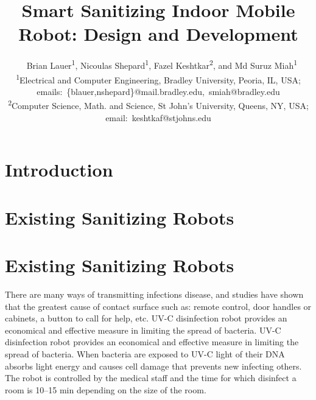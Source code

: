 \documentclass[letterpaper]{article} %
\title{Smart Sanitizing Indoor Mobile Robot: Design and Development}
\author{~%
Brian Lauer\textsuperscript{\rm 1}, Nicoulas Shepard\textsuperscript{\rm 1},
Fazel Keshtkar\textsuperscript{\rm 2}, and Md Suruz Miah\textsuperscript{\rm 1}
\\  
\textsuperscript{\rm 1}Electrical and Computer Engineering, Bradley University, Peoria, IL, USA; emails:~\{blauer,nshepard\}@mail.bradley.edu,~smiah@bradley.edu\\
\textsuperscript{\rm 2}Computer Science, Math. and Science, St John's University, Queens, NY, USA; email:~keshtkaf@stjohns.edu
}
\begin{document}
\maketitle

\begin{abstract}
\end{abstract}

\section{Introduction}
\label{sec:introduction}

\section{Existing Sanitizing Robots} 
\section{Existing Sanitizing Robots} 
\label{sec:Literature}
There are many ways of transmitting infections disease, and studies have shown that the greatest cause of contact surface such as: remote control, door handles or cabinets, a button to call for help, etc. UV-C disinfection robot provides an economical and effective measure in limiting the spread of bacteria.  UV-C disinfection robot provides an economical and effective measure in limiting the spread of bacteria. When bacteria are exposed to UV-C light of their DNA absorbs light energy and causes cell damage that prevents new infecting others. The robot is controlled by the medical staff and the time for which disinfect a room is 10–15 min depending on the size of the room. 
\end{document}
